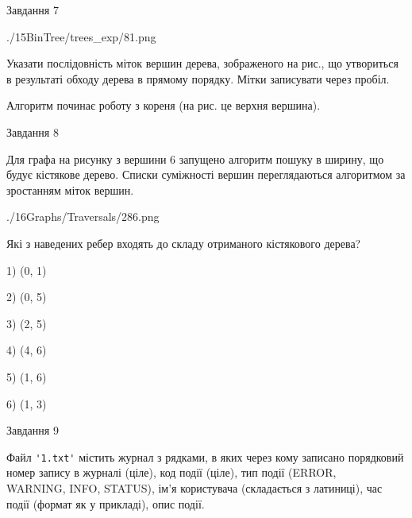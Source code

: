 \documentclass[12pt, ukrainian]{article}
\def\code#1{\Verb!#1!}
\begin{document}
{\vspace{10mm}\par

\newpage
\begin{minipage}[t]{9.7cm}
               
{\begin{center}Завдання {7}\end{center}}
\vspace{-6mm}

\begin{center}
	{./15BinTree/trees_exp/81.png}
\end{center}
Указати послідовність міток вершин дерева, зображеного на рис., що утвориться в результаті обходу дерева в прямому порядку. Мітки записувати через пробіл.\par Алгоритм починає роботу з кореня (на рис. це верхня вершина).\par

\end{minipage}
\vline \hspace{8mm}
\begin{minipage}[t]{8.0cm}
               
{\begin{center}Завдання {8}\end{center}}
\vspace{-6mm}
Для графа на рисунку з вершини 6 запущено алгоритм пошуку в ширину, що будує кістякове дерево. Списки суміжності вершин переглядаються алгоритмом за зростанням міток вершин.\par
\begin{center}
	{./16Graphs/Traversals/286.png}
\end{center}
\par Які з наведених ребер входять до складу отриманого кістякового дерева?\par
1) (0, 1)\par
2) (0, 5)\par
3) (2, 5)\par
4) (4, 6)\par
5) (1, 6)\par
6) (1, 3)\par
{\vskip 15pt} \par

\end{minipage}

               
{\begin{center}Завдання {9}\end{center}}
\vspace{-6mm}
Файл \code{'1.txt'} містить журнал з рядками, в яких через кому записано поряд\-ко\-вий номер запису в журналі (ціле), код події (ціле), тип події (ERROR,\\ WARNING, INFO, STATUS), ім'я користувача (складається з латиниці), час події (фор\-мат як у прикладі), опис події.

}
\end{document}
